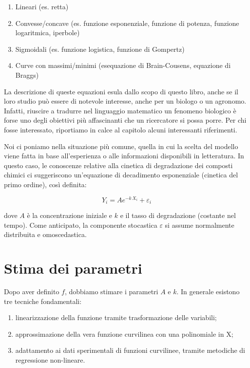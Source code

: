 \documentclass[a4paper,12pt,oneside]{book}
\providecommand{\tightlist}{%
  \setlength{\itemsep}{0pt}\setlength{\parskip}{0pt}}
\begin{document}
\begin{enumerate}
\def\labelenumi{\arabic{enumi}.}
\tightlist
\item
  Lineari (es. retta)
\item
  Convesse/concave (es. funzione esponenziale, funzione di potenza, funzione logaritmica, iperbole)
\item
  Sigmoidali (es. funzione logistica, funzione di Gompertz)
\item
  Curve con massimi/minimi (esequazione di Brain-Cousens, equazione di Braggs)
\end{enumerate}

La descrizione di queste equazioni esula dallo scopo di questo libro, anche se il loro studio può essere di notevole interesse, anche per un biologo o un agronomo. Infatti, riuscire a tradurre nel linguaggio matematico un fenomeno biologico è forse uno degli obiettivi più affascinanti che un ricercatore si possa porre. Per chi fosse interessato, riportiamo in calce al capitolo alcuni interessanti riferimenti.

Noi ci poniamo nella situazione più comune, quella in cui la scelta del modello viene fatta in base all'esperienza o alle informazioni disponibili in letteratura. In questo caso, le conoscenze relative alla cinetica di degradazione dei composti chimici ci suggeriscono un'equazione di decadimento esponenziale (cinetica del primo ordine), così definita:

\[Y_i = A e^{-k \,X_i} + \varepsilon_i\]

dove \(A\) è la concentrazione iniziale e \(k\) e il tasso di degradazione (costante nel tempo). Come anticipato, la componente stocastica \(\varepsilon\) si assume normalmente distribuita e omoscedastica.

\hypertarget{stima-dei-parametri-3}{%
\section{Stima dei parametri}\label{stima-dei-parametri-3}}

Dopo aver definito \(f\), dobbiamo stimare i parametri \(A\) e \(k\). In generale esistono tre tecniche fondamentali:

\begin{enumerate}
\def\labelenumi{\arabic{enumi}.}
\tightlist
\item
  linearizzazione della funzione tramite trasformazione delle variabili;
\item
  approssimazione della vera funzione curvilinea con una polinomiale in X;
\item
  adattamento ai dati sperimentali di funzioni curvilinee, tramite metodiche di regressione non-lineare.
\end{enumerate}
\end{document}
